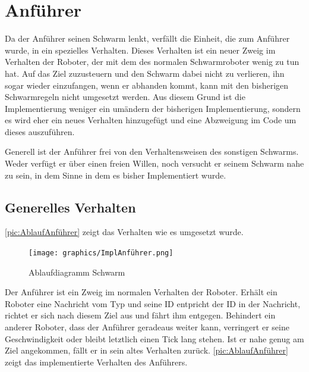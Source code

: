 %










\section{Anführer}

Da der Anführer seinen Schwarm lenkt, verfällt die Einheit, die zum Anführer wurde, in ein spezielles Verhalten. Dieses Verhalten ist ein neuer Zweig im Verhalten der Roboter, der mit dem des normalen Schwarmroboter wenig zu tun hat. Auf das Ziel zuzusteuern und den Schwarm dabei nicht zu verlieren, ihn sogar wieder einzufangen, wenn er abhanden kommt, kann mit den bisherigen Schwarmregeln nicht umgesetzt werden. Aus diesem Grund ist die Implementierung weniger ein umändern der bisherigen Implementierung, sondern es wird eher ein neues Verhalten hinzugefügt und eine Abzweigung im Code um dieses auszuführen.

Generell ist der Anführer frei von den Verhaltensweisen des sonstigen Schwarms. Weder verfügt er über einen freien Willen, noch versucht er seinem Schwarm nahe zu sein, in dem Sinne in dem es bisher Implementiert wurde.

\subsection*{Generelles Verhalten}

\autoref{pic:AblaufAnführer} zeigt das Verhalten wie es umgesetzt wurde.

\begin{figure}
	\texttt{[image: graphics/ImplAnführer.png]}
	\caption{Ablaufdiagramm Schwarm}
	\label{pic:AblaufAnführer}
\end{figure}

Der Anführer ist ein Zweig im normalen Verhalten der Roboter. Erhält ein Roboter eine Nachricht vom Typ  und seine ID entpricht der ID in der Nachricht, richtet er sich nach diesem Ziel aus und fährt ihm entgegen. Behindert ein anderer Roboter, dass der Anführer geradeaus weiter kann, verringert er seine Geschwindigkeit oder bleibt letztlich einen Tick lang stehen. Ist er nahe genug am Ziel angekommen, fällt er in sein altes Verhalten zurück. \autoref{pic:AblaufAnführer} zeigt das implementierte Verhalten des Anführers.

